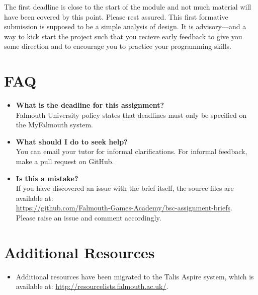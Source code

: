 \documentclass{../../../fal_assignment}
\begin{document}
The first deadline is  close to the start of the module and not much material will have been covered by this point. Please rest assured. This first formative submission is supposed to be a simple analysis of design. It is advisory---and a way to kick start the project such that you recieve early feedback to give you some direction and to encourage you to practice your programming skills.

\section*{FAQ}

\begin{itemize}
	\item 	\textbf{What is the deadline for this assignment?} \\ 
    		Falmouth University policy states that deadlines must only be specified on the MyFalmouth system.
    		
	\item 	\textbf{What should I do to seek help?} \\ 
    		You can email your tutor for informal clarifications. For informal feedback, make a pull request on GitHub. 
    		
    	\item 	\textbf{Is this a mistake?} \\ 	
    		If you have discovered an issue with the brief itself, the source files are available at: \\
    		\url{https://github.com/Falmouth-Games-Academy/bsc-assignment-briefs}.\\
    		 Please raise an issue and comment accordingly.
\end{itemize}

\section*{Additional Resources}

\begin{itemize}
    \item Additional resources have been migrated to the Talis Aspire system, which is available at: \url{http://resourcelists.falmouth.ac.uk/}.
\end{itemize}
\end{document}
